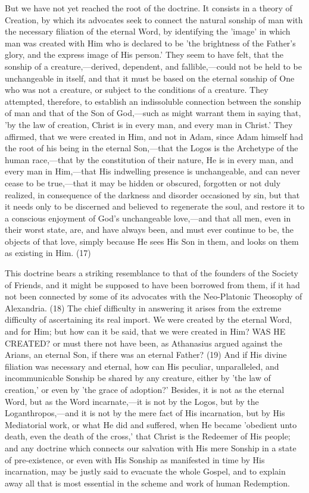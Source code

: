 \documentclass[
]{book}
\begin{document}
But we have not yet reached the root of the doctrine. It consists in a theory of Creation, by which its advocates seek to connect the natural sonship of man with the necessary filiation of the eternal Word, by identifying the 'image' in which man was created with Him who is declared to be 'the brightness of the Father's glory, and the express image of His person.' They seem to have felt, that the sonship of a creature,---derived, dependent, and fallible,---could not be held to be unchangeable in itself, and that it must be based on the eternal sonship of One who was not a creature, or subject to the conditions of a creature. They attempted, therefore, to establish an indissoluble connection between the sonship of man and that of the Son of God,---such as might warrant them in saying that, 'by the law of creation, Christ is in every man, and every man in Christ.' They affirmed, that we were created in Him, and not in Adam, since Adam himself had the root of his being in the eternal Son,---that the Logos is the Archetype of the human race,---that by the constitution of their nature, He is in every man, and every man in Him,---that His indwelling presence is unchangeable, and can never cease to be true,---that it may be hidden or obscured, forgotten or not duly realized, in consequence of the darkness and disorder occasioned by sin, but that it needs only to be discerned and believed to regenerate the soul, and restore it to a conscious enjoyment of God's unchangeable love,---and that all men, even in their worst state, are, and have always been, and must ever continue to be, the objects of that love, simply because He sees His Son in them, and looks on them as existing in Him. (17)

This doctrine bears a striking resemblance to that of the founders of the Society of Friends, and it might be supposed to have been borrowed from them, if it had not been connected by some of its advocates with the Neo-Platonic Theosophy of Alexandria. (18) The chief difficulty in answering it arises from the extreme difficulty of ascertaining its real import. We were created by the eternal Word, and for Him; but how can it be said, that we were created in Him? WAS HE CREATED? or must there not have been, as Athanasius argued against the Arians, an eternal Son, if there was an eternal Father? (19) And if His divine filiation was necessary and eternal, how can His peculiar, unparalleled, and incommunicable Sonship be shared by any creature, either by 'the law of creation,' or even by 'the grace of adoption?' Besides, it is not as the eternal Word, but as the Word incarnate,---it is not by the Logos, but by the Loganthropos,---and it is not by the mere fact of His incarnation, but by His Mediatorial work, or what He did and suffered, when He became 'obedient unto death, even the death of the cross,' that Christ is the Redeemer of His people; and any doctrine which connects our salvation with His mere Sonship in a state of pre-existence, or even with His Sonship as manifested in time by His incarnation, may be justly said to evacuate the whole Gospel, and to explain away all that is most essential in the scheme and work of human Redemption.
\end{document}
